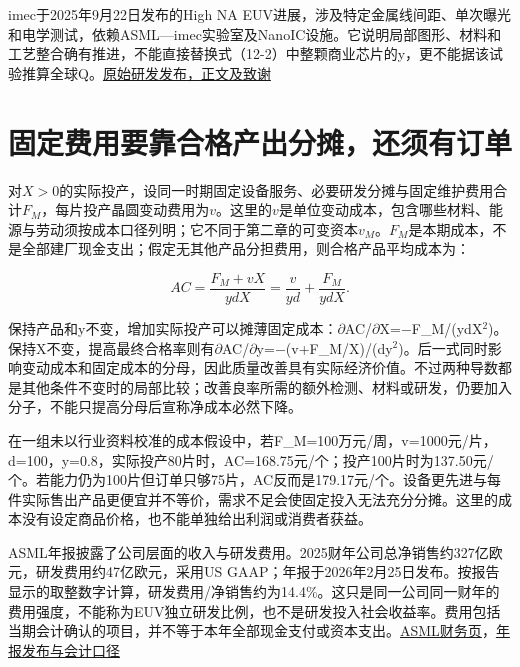 \documentclass[UTF8,fontset=windows,12pt,a4paper,oneside,openany]{ctexbook}
\begin{document}
imec于2025年9月22日发布的High NA EUV进展，涉及特定金属线间距、单次曝光和电学测试，依赖ASML—imec实验室及NanoIC设施。它说明局部图形、材料和工艺整合确有推进，不能直接替换式（12-2）中整颗商业芯片的y，更不能据该试验推算全球Q。\href{https://www.imec-int.com/en/press/imec-achieves-new-milestones-single-patterning-high-na-euv-lithography-both-damascene-and}{原始研发发布，正文及致谢}

\section{固定费用要靠合格产出分摊，还须有订单}

对$X>0$的实际投产，设同一时期固定设备服务、必要研发分摊与固定维护费用合计$F_M$，每片投产晶圆变动费用为$v$。这里的$v$是单位变动成本，包含哪些材料、能源与劳动须按成本口径列明；它不同于第二章的可变资本$v_M$。$F_M$是本期成本，不是全部建厂现金支出；假定无其他产品分担费用，则合格产品平均成本为：

\[
AC=\frac{F_M+vX}{ydX}=\frac{v}{yd}+\frac{F_M}{ydX}.\tag{12-3}
\]

保持产品和y不变，增加实际投产可以摊薄固定成本：\ensuremath{\partial}AC/\ensuremath{\partial}X=\ensuremath{-}F\_M/(ydX\ensuremath{^2})。保持X不变，提高最终合格率则有\ensuremath{\partial}AC/\ensuremath{\partial}y=\ensuremath{-}(v+F\_M/X)/(dy\ensuremath{^2})。后一式同时影响变动成本和固定成本的分母，因此质量改善具有实际经济价值。不过两种导数都是其他条件不变时的局部比较；改善良率所需的额外检测、材料或研发，仍要加入分子，不能只提高分母后宣称净成本必然下降。

在一组未以行业资料校准的成本假设中，若F\_M=100万元/周，v=1000元/片，d=100，y=0.8，实际投产80片时，AC=168.75元/个；投产100片时为137.50元/个。若能力仍为100片但订单只够75片，AC反而是179.17元/个。设备更先进与每件实际售出产品更便宜并不等价，需求不足会使固定投入无法充分分摊。这里的成本没有设定商品价格，也不能单独给出利润或消费者获益。

ASML年报披露了公司层面的收入与研发费用。2025财年公司总净销售约327亿欧元，研发费用约47亿欧元，采用US GAAP；年报于2026年2月25日发布。按报告显示的取整数字计算，研发费用/净销售约为14.4\%。这只是同一公司同一财年的费用强度，不能称为EUV独立研发比例，也不是研发投入社会收益率。费用包括当期会计确认的项目，并不等于本年全部现金支付或资本支出。\href{https://www.asml.com/investors/annual-report/2025/financials}{ASML财务页}，\href{https://investor.asml.com/annual-reports}{年报发布与会计口径}
\end{document}
